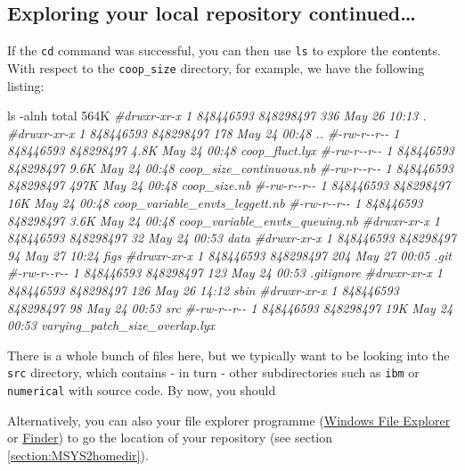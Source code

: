 \documentclass[
]{book}
\newenvironment{Shaded}{\begin{snugshade}}{\end{snugshade}}
\newcommand{\AttributeTok}[1]{\textcolor[rgb]{0.77,0.63,0.00}{#1}}
\newcommand{\CommentTok}[1]{\textcolor[rgb]{0.56,0.35,0.01}{\textit{#1}}}
\newcommand{\ExtensionTok}[1]{#1}
\newcommand{\FunctionTok}[1]{\textcolor[rgb]{0.00,0.00,0.00}{#1}}
\newcommand{\NormalTok}[1]{#1}
\begin{document}
\hypertarget{exploring-your-local-repository-continued}{%
\subsection{Exploring your local repository continued\ldots{}}\label{exploring-your-local-repository-continued}}

If the \texttt{cd} command was successful, you can then use \texttt{ls} to explore the contents. With respect to the \texttt{coop\_size} directory, for example, we have the following listing:

\begin{Shaded}
\begin{Highlighting}[]
\FunctionTok{ls} \AttributeTok{{-}alnh}
\ExtensionTok{total}\NormalTok{ 564K}
\CommentTok{\#drwxr{-}xr{-}x 1 848446593 848298497  336 May 26 10:13 .}
\CommentTok{\#drwxr{-}xr{-}x 1 848446593 848298497  178 May 24 00:48 ..}
\CommentTok{\#{-}rw{-}r{-}{-}r{-}{-} 1 848446593 848298497 4.8K May 24 00:48 coop\_fluct.lyx}
\CommentTok{\#{-}rw{-}r{-}{-}r{-}{-} 1 848446593 848298497 9.6K May 24 00:48 coop\_size\_continuous.nb}
\CommentTok{\#{-}rw{-}r{-}{-}r{-}{-} 1 848446593 848298497 497K May 24 00:48 coop\_size.nb}
\CommentTok{\#{-}rw{-}r{-}{-}r{-}{-} 1 848446593 848298497  16K May 24 00:48 coop\_variable\_envts\_leggett.nb}
\CommentTok{\#{-}rw{-}r{-}{-}r{-}{-} 1 848446593 848298497 3.6K May 24 00:48 coop\_variable\_envts\_queuing.nb}
\CommentTok{\#drwxr{-}xr{-}x 1 848446593 848298497   32 May 24 00:53 data}
\CommentTok{\#drwxr{-}xr{-}x 1 848446593 848298497   94 May 27 10:24 figs}
\CommentTok{\#drwxr{-}xr{-}x 1 848446593 848298497  204 May 27 00:05 .git}
\CommentTok{\#{-}rw{-}r{-}{-}r{-}{-} 1 848446593 848298497  123 May 24 00:53 .gitignore}
\CommentTok{\#drwxr{-}xr{-}x 1 848446593 848298497  126 May 26 14:12 sbin}
\CommentTok{\#drwxr{-}xr{-}x 1 848446593 848298497   98 May 24 00:53 src}
\CommentTok{\#{-}rw{-}r{-}{-}r{-}{-} 1 848446593 848298497  19K May 24 00:53 varying\_patch\_size\_overlap.lyx}
\end{Highlighting}
\end{Shaded}

There is a whole bunch of files here, but we typically want to be looking into the \texttt{src} directory, which contains - in turn - other subdirectories such as \texttt{ibm} or \texttt{numerical} with source code. By now, you should

Alternatively, you can also your file explorer programme (\href{https://support.microsoft.com/en-us/windows/find-and-open-file-explorer-ef370130-1cca-9dc5-e0df-2f7416fe1cb1\#WindowsVersion=Windows_10}{Windows File Explorer} or \href{https://support.apple.com/en-gb/HT201732}{Finder}) to go the location of your repository (see section \ref{section:MSYS2homedir}).
\end{document}
